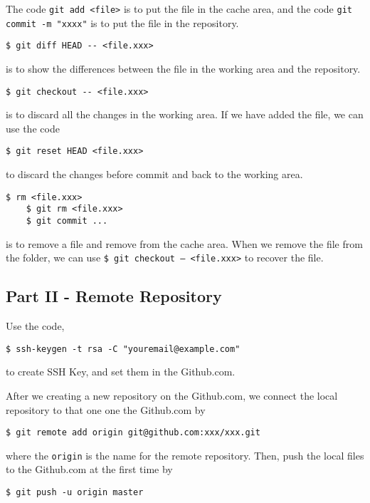 \documentclass[11pt]{article}
\begin{document}
The code \texttt{git add <file>} is to put the file in the cache area, and the code \texttt{git commit -m "xxxx"} is to put the file in the repository.

\begin{lstlisting}[basicstyle=\small\conso]
    $ git diff HEAD -- <file.xxx>
\end{lstlisting}
is to show the differences between the file in the working area and the repository.

\begin{lstlisting}[basicstyle=\small\conso]
    $ git checkout -- <file.xxx>
\end{lstlisting}
is to discard all the changes in the working area. 
If we have added the file, we can use the code
\begin{lstlisting}[basicstyle=\small\conso]
    $ git reset HEAD <file.xxx>
\end{lstlisting}
to discard the changes before commit and back to the working area.

\begin{lstlisting}[basicstyle=\small\conso]
    $ rm <file.xxx>
    $ git rm <file.xxx>
    $ git commit ...
\end{lstlisting}
is to remove a file and remove from the cache area. 
When we remove the file from the folder, we can use \texttt{\$ git checkout -- <file.xxx>} to recover the file.

\subsection{Part II - Remote Repository}
Use the code,
\begin{lstlisting}[basicstyle=\small\conso]
    $ ssh-keygen -t rsa -C "youremail@example.com"
\end{lstlisting}
to create SSH Key, and set them in the Github.com.

After we creating a new repository on the Github.com, we connect the local repository to that one one the Github.com by 
\begin{lstlisting}[basicstyle=\small\conso]
    $ git remote add origin git@github.com:xxx/xxx.git
\end{lstlisting}
where the \texttt{origin} is the name for the remote repository.
Then, push the local files to the Github.com at the first time by 
\begin{lstlisting}[basicstyle=\small\conso]
    $ git push -u origin master
\end{lstlisting}
\end{document}
